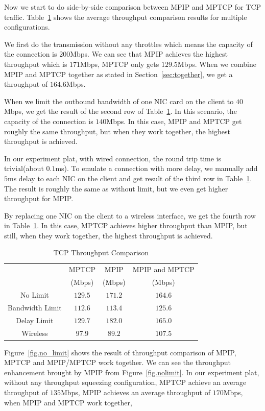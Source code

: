 Now we start to do side-by-side comparison between MPIP and MPTCP for TCP traffic. Table~\ref{tb.tcp} shows the average throughput comparison results for multiple configurations. 

We first do the transmission without any throttles which means the capacity of the connection is $200$Mbps. We can see that MPIP achieves the highest throughput which is $171$Mbps, MPTCP only gets $129.5$Mbps. When we combine MPIP and MPTCP together as stated in Section~\ref{sec:together}, we get a throughput of $164.6$Mbps.

When we limit the outbound bandwidth of one NIC card on the client to $40$Mbps, we get the result of the second row of Table~\ref{tb.tcp}. In this scenario, the capacity of the connection is $140$Mbps. In this case, MPIP and MPTCP get roughly the same throughput, but when they work together, the highest throughput is achieved.

In our experiment plat, with wired connection, the round trip time is trivial(about $0.1$ms). To emulate a connection with more delay, we manually add $5$ms delay to each NIC on the client and get result of the third row in Table~\ref{tb.tcp}. The result is roughly the same as without limit, but we even get higher throughput for MPIP.

By replacing one NIC on the client to a wireless interface, we get the fourth row in Table~\ref{tb.tcp}. In this case, MPTCP achieves higher throughput than MPIP, but still, when they work together, the highest throughput is achieved.


\begin{table}
\caption{\label{tb.tcp}TCP Throughput Comparison}
\centering
\begin{tabular}{|c|c|c|c|}
\hline
  & MPTCP &  MPIP &  MPIP and MPTCP  \\
  & (Mbps) &  (Mbps) &  (Mbps)  \\
\hline
No Limit & $129.5$ & $171.2$ & $164.6$  \\
\hline
Bandwidth Limit & $112.6$ & $113.4$ & $125.6$  \\
\hline
Delay Limit & $129.7$ & $182.0$ & $165.0$  \\
\hline
Wireless & $97.9$ & $89.2$ & $107.5$  \\
\hline
\end{tabular}
\end{table}


Figure~\ref{fig.no_limit} shows the result of throughput comparison of MPIP, MPTCP and MPIP/MPTCP work together. We can see the throughput enhancement brought by MPIP from Figure~\ref{fig.nolimit}. In our experiment plat, without any throughput squeezing configuration, MPTCP achieve an average throughput of $135$Mbps, MPIP achieves an average throughput of $170$Mbps, when MPIP and MPTCP work together,




